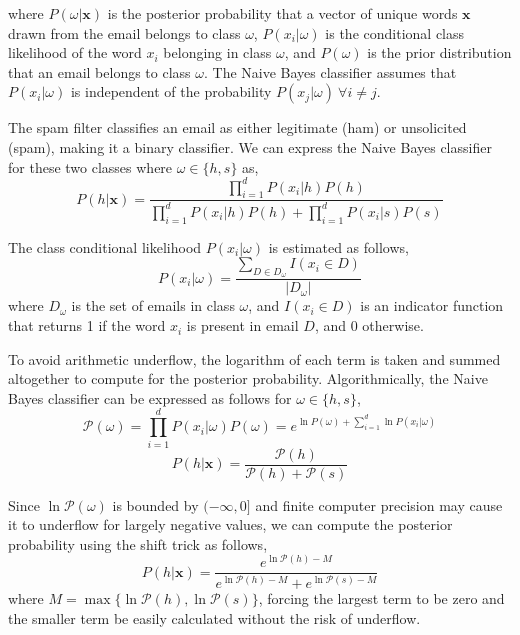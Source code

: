 \documentclass{acm_proc_article-sp}
\begin{document}
where $P(\omega|\mathbf{x})$ is the posterior probability that a vector of unique words $\textbf{x}$ drawn from the email belongs to class $\omega$, $P(x_i|\omega)$ is the conditional class likelihood of the word $x_i$ belonging in class $\omega$, and $P(\omega)$ is the prior distribution that an email belongs to class $\omega$.
The Naive Bayes classifier assumes that $P(x_i|\omega)$ is independent of the probability $P(x_j|\omega)\  \forall i \neq j$.

The spam filter classifies an email as either legitimate (ham) or unsolicited (spam), making it a binary classifier. We can express the Naive Bayes classifier for these two classes where $\omega \in \{h, s\}$ as,
\begin{equation}
    P(h|\mathbf{x})=\frac{\prod_{i=1}^d{P(x_i|h)P(h)}}{\prod_{i=1}^d{P(x_i|h)P(h)}+\prod_{i=1}^d{P(x_i|s)P(s)}}
\end{equation}

The class conditional likelihood $P(x_i|\omega)$ is estimated as follows,
\begin{equation}
    P(x_i|\omega) = \frac{\sum_{D\in D_\omega} I(x_i\in D)}{|D_\omega|}
\end{equation}
where $D_\omega$ is the set of emails in class $\omega$, and $I(x_i\in D)$ is an indicator function that returns 1 if the word $x_i$ is present in email $D$, and 0 otherwise.

To avoid arithmetic underflow, the logarithm of each term is taken and summed altogether to compute for the posterior probability. Algorithmically, the Naive Bayes classifier can be expressed as follows for $\omega \in \{h, s\}$,
$$
    \mathcal{P}(\omega) = \prod^d_{i=1}P(x_i|\omega)P(\omega) = e^{\ln{P(\omega)}+\sum_{i=1}^d\ln{P(x_i|\omega)}}
$$
\begin{equation}
    P(h|\mathbf{x}) = \frac{\mathcal{P}(h)}{\mathcal{P}(h)+\mathcal{P}(s)} 
\end{equation}

Since $\ln\mathcal{P}(\omega)$ is bounded by $(-\infty, 0]$ and finite computer precision may cause it to underflow for largely negative values, we can compute the posterior probability using the shift trick as follows,
\begin{equation}
P(h|\mathbf{x}) = \frac{e^{\ln\mathcal{P}(h) - M}}{e^{\ln\mathcal{P}(h) - M} + e^{\ln\mathcal{P}(s) - M}}
\end{equation}
where $M = \max\{\ln\mathcal{P}(h), \ln\mathcal{P}(s)\}$, forcing the largest term to be zero and the smaller term be easily calculated without the risk of underflow.
\end{document}
